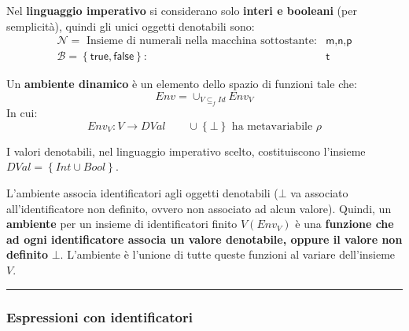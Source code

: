 \documentclass[a4paper]{article}
\newcommand{\longline}{\noindent\rule{\textwidth}{0.4pt}}
\begin{document}
	Nel \textbf{linguaggio imperativo} si considerano solo \textbf{interi e booleani} (per semplicità), quindi gli unici oggetti denotabili sono:
	\begin{equation*}
		\begin{array}{rl}
			\mathcal{N} = \text{ Insieme di numerali nella macchina sottostante:} & \textsf{m,n,p} \\
			\mathcal{B} = \left\{\textsf{true}, \textsf{false}\right\}: & \textsf{t}
		\end{array}
	\end{equation*}
	\begin{boxdef}
		Un \textcolor{Red3}{\textbf{ambiente dinamico}} è un elemento dello spazio di funzioni tale che:
		\begin{equation*}
			Env = \cup_{V \subseteq_{f} Id} Env_{V}
		\end{equation*}
		In cui:
		\begin{equation*}
			Env_{V}: V \rightarrow DVal \hspace{2em} \cup\left\{\bot\right\} \text{ ha metavariabile }\rho
		\end{equation*}
	\end{boxdef}
	
	\noindent
	I valori denotabili, nel linguaggio imperativo scelto, costituiscono l'insieme $DVal = \left\{Int \cup Bool\right\}$.\newline
	
	\noindent
	L'ambiente associa identificatori agli oggetti denotabili ($\bot$ va associato all'identificatore non definito, ovvero non associato ad alcun valore). Quindi, un \textbf{ambiente} per un insieme di identificatori finito $V\left(Env_{V}\right)$ è una \textbf{funzione che ad ogni identificatore associa un valore denotabile, oppure il valore non definito }$\bot$. L'ambiente è l'unione di tutte queste funzioni al variare dell'insieme $V$.
	
	\longline
	
	\subsubsection{Espressioni con identificatori}
	
\end{document}
